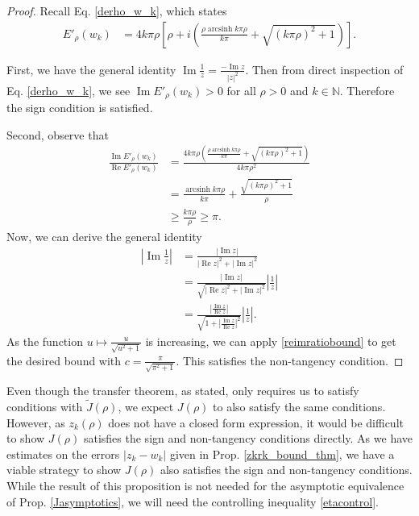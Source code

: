 \documentclass{amsart}
\theoremstyle{plain}
\numberwithin{theorem}{section}
\DeclareMathOperator{\arcsinh}{arcsinh}
\DeclareMathOperator{\Rez}{Re}
\DeclareMathOperator{\Imz}{Im}
\theoremstyle{definition}
\theoremstyle{remark}
\theoremstyle{brakets}
\newcommand{\N}{\mathbb{N}}
\begin{document}
\begin{proof}
Recall Eq. \eqref{derho_w_k}, which states
\begin{align*}
 E'_\rho(w_k) &= 4k\pi \rho\left[ \rho + i \left( \frac{\rho \arcsinh k \pi \rho}{k \pi} +  \sqrt{(k\pi\rho)^2 + 1} \right) \right].
\end{align*}

    First, we have the general identity $\Imz \frac{1}{z} = \frac{- \Imz z}{|z|^2}$. Then from direct inspection of Eq. \eqref{derho_w_k}, we see $\Imz E'_\rho(w_k) > 0$ for all $\rho > 0$ and $k \in \N$. Therefore the sign condition is satisfied.

    Second, observe that
\begin{align}
    \frac{\Imz E'_\rho(w_k)}{\Rez E'_\rho(w_k)} &= \frac{4k\pi\rho\left( \frac{\rho \arcsinh k \pi \rho}{k \pi} +  \sqrt{(k\pi\rho)^2 + 1} \right)}{4k\pi\rho^2} \nonumber \\
    &= \frac{\arcsinh k\pi\rho}{k\pi} + \frac{\sqrt{(k\pi\rho)^2 + 1}}{\rho} \nonumber \\
    &\geq \frac{k\pi\rho}{\rho} \geq \pi. \label{reimratiobound}
\end{align}
Now, we can derive the general identity
\begin{align*}
    \left|\Imz \frac{1}{z} \right| &= \frac{ \left|\Imz z \right|}{\left|\Rez z\right|^2 + \left|\Imz z\right|^2}\\
    &= \frac{\left|\Imz z \right|}{\sqrt{\left|\Rez z\right|^2 + \left|\Imz z\right|^2}} \left| \frac{1}{z}\right|\\
    &= \frac{\left| \frac{\Imz z}{\Rez z}  \right|}{\sqrt{1 + \left| \frac{\Imz z}{\Rez z}\right|^2}} \left| \frac{1}{z}\right|.
\end{align*}
As the function $u \mapsto \frac{u}{\sqrt{u^2+1}}$ is increasing, we can apply \eqref{reimratiobound} to get the desired bound with $c = \frac{\pi}{\sqrt{\pi^2 + 1}}$. This satisfies the non-tangency condition.
\end{proof}

Even though the transfer theorem, as stated, only requires us to satisfy conditions with $\tilde{J}(\rho)$, we expect $J(\rho)$ to also satisfy the same conditions. However, as $z_k(\rho)$ does not have a closed form expression, it would be difficult to show $J(\rho)$ satisfies the sign and non-tangency conditions directly. As we have estimates on the errors $|z_k - w_k|$ given in Prop. \ref{zkrk_bound_thm}, we have a viable strategy to show $J(\rho)$ also satisfies the sign and non-tangency conditions. While the result of this proposition is not needed for the asymptotic equivalence of Prop. \ref{Jasymptotics}, we will need the controlling inequality \ref{etacontrol}.
\end{document}
